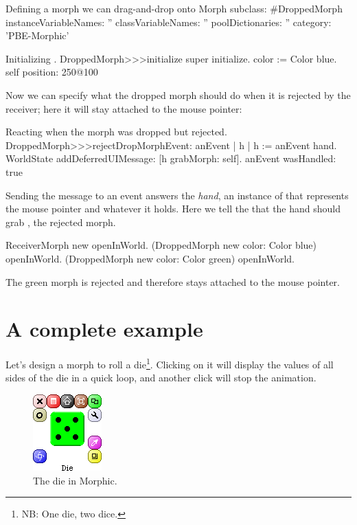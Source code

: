 \documentclass[a4paper,10pt,twoside]{book}
\begin{document}
\begin{classdef}{Defining a morph we can drag-and-drop onto }
Morph subclass: #DroppedMorph
	instanceVariableNames: ''
	classVariableNames: ''
	poolDictionaries: ''
	category: 'PBE-Morphic'
\end{classdef}

\begin{method}{Initializing .}
DroppedMorph>>>initialize
	super initialize.
	color := Color blue.
	self position: 250@100
\end{method}

Now we can specify what the dropped morph should do when it is rejected by the receiver; here it will stay attached to the mouse pointer:
\begin{method}{Reacting when the morph was dropped but rejected.}
DroppedMorph>>>rejectDropMorphEvent: anEvent
	| h |
	h := anEvent hand.
	WorldState
		addDeferredUIMessage: [h grabMorph: self].
	anEvent wasHandled: true
\end{method}

Sending the  message to an event answers the \emph{hand}, an instance of  that represents the mouse pointer and whatever it holds.
Here we tell the  that the hand should grab , the rejected morph.

\begin{code}{}
ReceiverMorph new openInWorld.
(DroppedMorph new color: Color blue) openInWorld.
(DroppedMorph new color: Color green) openInWorld.
\end{code}
\noindent
The green morph is rejected and therefore stays attached to the mouse pointer.

\section{A complete example}

Let's design a morph to roll a die\footnote{NB: One die, two dice.}. Clicking on it will display the values of all sides of the die in a quick loop, and another click will stop the animation.

\begin{figure}[ht]
	\centerline{\includegraphics[scale=0.65]{die}}
	\caption{The die in Morphic.
		}
\end{figure}
\end{document}
